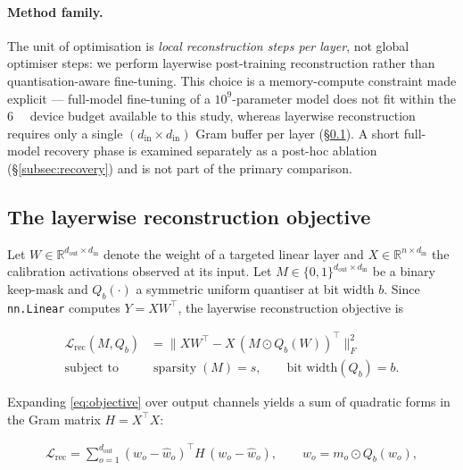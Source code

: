 \paragraph{Method family.} The unit of optimisation is \emph{local reconstruction steps per
layer}, not global optimiser steps: we perform layerwise post-training reconstruction rather
than quantisation-aware fine-tuning. This choice is a memory-compute constraint made
explicit --- full-model fine-tuning of a $10^9$-parameter model does not fit within the
\SI{6}{\giga\byte} device budget available to this study, whereas layerwise reconstruction
requires only a single $(d_{\mathrm{in}}\!\times\!d_{\mathrm{in}})$ Gram buffer per layer
(\S\ref{subsec:objective}). A short full-model recovery phase is examined separately as a
post-hoc ablation (\S\ref{subsec:recovery}) and is not part of the primary comparison.

\subsection{The layerwise reconstruction objective}
\label{subsec:objective}

Let $W \in \mathbb{R}^{d_{\mathrm{out}} \times d_{\mathrm{in}}}$ denote the weight of a
targeted linear layer and $X \in \mathbb{R}^{n \times d_{\mathrm{in}}}$ the calibration
activations observed at its input. Let $M \in \{0,1\}^{d_{\mathrm{out}} \times d_{\mathrm{in}}}$
be a binary keep-mask and $Q_b(\cdot)$ a symmetric uniform quantiser at bit width $b$. Since
\texttt{nn.Linear} computes $Y = XW^{\top}$, the layerwise reconstruction objective is

\begin{align}
  \mathcal{L}_{\mathrm{rec}}(M, Q_b)
    &= \bigl\| XW^{\top} - X\,(M \odot Q_b(W))^{\top} \bigr\|_F^{2}
    \label{eq:objective} \\[2pt]
  \text{subject to}\quad
    &\operatorname{sparsity}(M) = s, \qquad \text{bit width}(Q_b) = b .
    \nonumber
\end{align}

Expanding \eqref{eq:objective} over output channels yields a sum of quadratic forms in the
Gram matrix $H = X^{\top}X$:

\begin{align}
  \mathcal{L}_{\mathrm{rec}}
    = \sum_{o=1}^{d_{\mathrm{out}}}
      (w_o - \hat{w}_o)^{\top} H \, (w_o - \hat{w}_o),
  \qquad
  \hat{w}_o = m_o \odot Q_b(w_o),
  \label{eq:gram}
\end{align}


